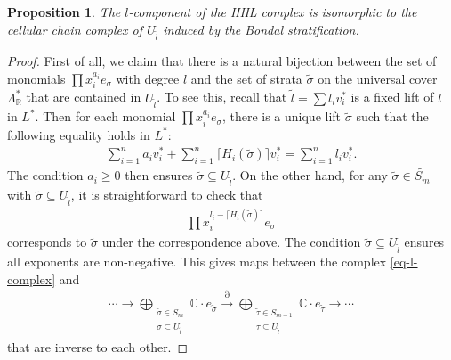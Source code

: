 \documentclass[10pt,a4paper]{amsart}
\newtheorem{proposition}{Proposition}
\def\C {{\mathbb C}}
\def\R {{\mathbb R}}
\begin{document}
\begin{proposition}\label{prop-isomorphic-to-singular}
    The $l$-component of the HHL complex is isomorphic to the cellular chain complex of $U_{\widetilde{l}}$ induced by the Bondal stratification.
\end{proposition}

\begin{proof}
    First of all, we claim that there is a natural bijection between the set of monomials $\prod x_i^{a_i} e_{\sigma}$ with degree $l$ and the set of strata $\widetilde{\sigma}$ on the universal cover $\Lambda^*_{\R}$ that are contained in $U_{\widetilde{l}}$. To see this, recall that $\widetilde{l} = \sum l_i v_i^*$ is a fixed lift of $l$ in $L^*$. Then for each monomial $\prod x_i^{a_i} e_{\sigma}$, there is a unique lift $\widetilde{\sigma}$ such that the following equality holds in $L^*$:
    \begin{align}\label{eq1}
        \sum_{i=1}^n a_i v_i^* + \sum_{i=1}^n \lceil H_i(\widetilde{\sigma}) \rceil v_i^* = \sum_{i=1}^n l_i v_i^*.
    \end{align}
    The condition $a_i\geq 0$ then ensures $\widetilde{\sigma}\subseteq U_{\widetilde{l}}$. On the other hand, for any $\widetilde{\sigma}\in \widetilde{S_m}$ with $\widetilde{\sigma}\subseteq U_{\widetilde{l}}$, it is straightforward to check that
    \begin{align*}
        \prod x_i^{l_i - \lceil H_i(\widetilde{\sigma}) \rceil } e_{\sigma}
    \end{align*}
    corresponds to $\widetilde{\sigma}$ under the correspondence above. The condition $\widetilde{\sigma}\subseteq U_{\widetilde{l}}$ ensures all exponents are non-negative. This gives maps between the complex \eqref{eq-l-complex} and
    \begin{align*}
        \cdots\rightarrow  \bigoplus_{\substack{ \widetilde{\sigma}\in \widetilde{S_m} \\ \widetilde{\sigma}\subseteq U_{\widetilde{l}} }} \C \cdot e_{\widetilde{\sigma}}\xrightarrow{\partial}  \bigoplus_{\substack{ \widetilde{\tau}\in \widetilde{S_{m-1}} \\ \widetilde{\tau}\subseteq U_{\widetilde{l}} }} \C \cdot  e_{\widetilde{\tau}}\rightarrow \cdots
    \end{align*}
    that are inverse to each other. 

    \smallskip
    

\end{proof}
\end{document}
